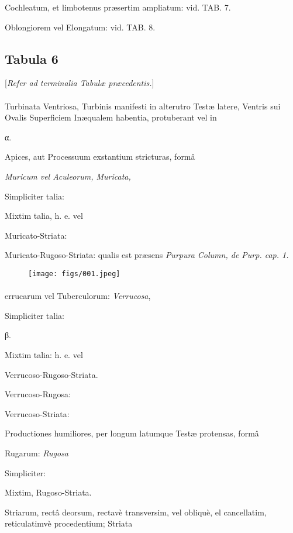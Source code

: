 \documentclass[a4paper, 11pt, oneside, polutonikogreek, german]{article}
\begin{document}
Cochleatum, et limbotenus præsertim ampliatum: vid. TAB. 7.

Oblongiorem vel Elongatum: vid. TAB. 8.
\clearpage
\subsection{Tabula 6}
\begin{center}
[\emph{Refer ad terminalia Tabulæ præcedentis.}]
\end{center}
\paragraph{}
Turbinata Ventriosa, Turbinis manifesti in alterutro Testæ latere, Ventris sui Ovalis Superficiem Inæqualem habentia, protuberant vel in

α.

Apices, aut Processuum exstantium stricturas, formâ

\emph{Muricum vel Aculeorum, Muricata,}

Simpliciter talia:

Mixtim talia, h. e. vel

Muricato-Striata:

Muricato-Rugoso-Striata: qualis est præsens \emph{Purpura Column, de Purp. cap. 1.}

\begin{figure}[H]
\centering
\texttt{[image: figs/001.jpeg]}
\end{figure}
\paragraph{}
errucarum vel Tuberculorum: \emph{Verrucosa},

Simpliciter talia:

β.

Mixtim talia: h. e. vel

Verrucoso-Rugoso-Striata.

Verrucoso-Rugosa:

Verrucoso-Striata:

Productiones humiliores, per longum latumque Testæ protensas, formâ

Rugarum: \emph{Rugosa}

Simpliciter:

Mixtim, Rugoso-Striata.

Striarum, rectâ deorsum, rectavè transversim, vel obliquè, el cancellatim, reticulatimvè procedentium; Striata
\end{document}

